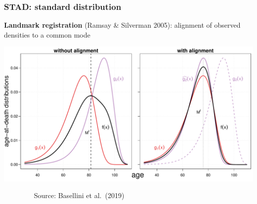 \documentclass[12pt, xcolor=table]{beamer}  %
\begin{document}
\begin{frame}[noframenumbering]\frametitle{STAD: standard distribution}

\vspace{-0.3cm}
	
	\begin{center}
		
		\textbf{Landmark registration} {\scriptsize (Ramsay \& Silverman 2005)}: alignment of observed densities to a common mode
		
		\vspace{0.3cm}
		
		\includegraphics[scale=.35]{Figures/Ch2/F8_4.pdf}
		
	\end{center}

\vspace{-0.15cm}
\scriptsize{$\quad\quad\quad\quad$ Source: Basellini et al.~(2019)}
	
\end{frame}	
\end{document}
